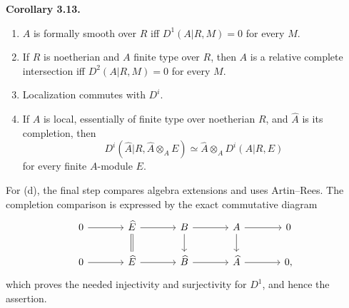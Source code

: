 \documentclass[11pt]{article}
\providecommand{\Ahat}{\widehat A}
\providecommand{\Bhat}{\widehat B}
\providecommand{\Ehat}{\widehat E}
\begin{document}
\textbf{Corollary 3.13.}
\begin{enumerate}[label=\textup{(\alph*)}]
\item \(A\) is formally smooth over \(R\) iff \(D^1(A|R,M)=0\) for every \(M\).
\item If \(R\) is noetherian and \(A\) finite type over \(R\), then \(A\) is a relative complete intersection iff \(D^2(A|R,M)=0\) for every \(M\).
\item Localization commutes with \(D^i\).
\item If \(A\) is local, essentially of finite type over noetherian \(R\), and \(\Ahat\) is its completion, then
\[
D^i(\Ahat|R,\Ahat\otimes_AE)\simeq \Ahat\otimes_AD^i(A|R,E)
\]
for every finite \(A\)-module \(E\).
\end{enumerate}
For (d), the final step compares algebra extensions and uses Artin--Rees.  The completion comparison is expressed by the exact commutative diagram
\[
\begin{tikzcd}[column sep=large]
0\arrow[r]&\Ehat\arrow[r]\arrow[d,equal]&B\arrow[r]\arrow[d]&A\arrow[r]\arrow[d]&0\\
0\arrow[r]&\Ehat\arrow[r]&\Bhat\arrow[r]&\Ahat\arrow[r]&0,
\end{tikzcd}
\]
which proves the needed injectivity and surjectivity for \(D^1\), and hence the assertion.
\end{document}

